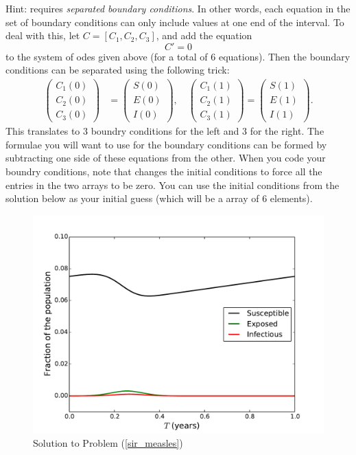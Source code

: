 \begin{problem}
Hint:  requires \emph{separated boundary conditions}. In other words, each equation in the set of boundary conditions can only include values at one end of the interval. 
To deal with this, let $C = [C_1, C_2, C_3]$, and add the equation 
\[C' = 0\]
to the system of odes given above (for a total of 6 equations). Then the boundary conditions can be separated using the following trick: 
\begin{align*}
	\begin{pmatrix}C_1(0) \\C_2(0) \\ C_3(0) \end{pmatrix} &= \begin{pmatrix}S(0) \\E(0) \\ I(0) \end{pmatrix}, \quad 	\begin{pmatrix}C_1(1) \\C_2(1) \\ C_3(1) \end{pmatrix} = \begin{pmatrix}S(1) \\E(1) \\ I(1) \end{pmatrix}.
\end{align*}
This translates to 3 boundry conditions for the left and 3 for the right. The formulae you will want to use for the boundary conditions can be formed by subtracting one side of these equations from the other. When you code your boundry conditions, note that  changes the initial conditions to force all the entries in the two arrays to be zero. You can use the initial conditions from the solution below as your initial guess (which will be a array of 6 elements).

\label{sir_measles}
\end{problem}

\begin{figure}[ht]
\centering
\includegraphics[width=\textwidth]{measles.pdf}
\caption{Solution to Problem (\ref{sir_measles}) }
\label{sir4}
\end{figure}






